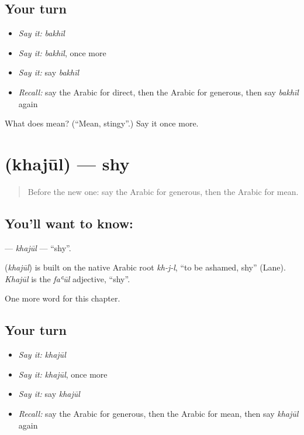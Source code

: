 \subsection*{Your turn}
\begin{itemize}
\raggedright
  \item \emph{Say it:} \emph{bakhīl}
  \item \emph{Say it:} \emph{bakhīl}, once more
  \item \emph{Say it:} say \emph{bakhīl}
  \item \emph{Recall:} say the Arabic for direct, then the Arabic for generous, then say \emph{bakhīl} again
\end{itemize}

\begin{tcolorbox}[breakable,colback=teal!4,colframe=teal!35!black,title={Before you move on}]
What does  mean? (\textquotedblleft{}Mean, stingy\textquotedblright{}.) Say it once more.
\end{tcolorbox}
\section[\texorpdfstring{\ar{خجول} (khajūl)}{خجول (khajūl)}]{ (khajūl) — shy}

\label{lesson:AR-C210-khajul}



\begin{quote}
Before the new one: say the Arabic for generous, then the Arabic for mean.
\end{quote}

\subsection*{You'll want to know: }
\textbf{} — \emph{khajūl} — \textquotedblleft{}shy\textquotedblright{}.

\begin{cousinweb}
\textbf{} (\emph{khajūl}) is built on the native Arabic root \emph{kh-j-l}, \textquotedblleft{}to be ashamed, shy\textquotedblright{} (Lane). \emph{Khajūl} is the \emph{faʿūl} adjective, \textquotedblleft{}shy\textquotedblright{}.
\end{cousinweb}

\begin{grammarlens}[title={What you've built}]
One more word for this chapter.
\end{grammarlens}

\subsection*{Your turn}
\begin{itemize}
\raggedright
  \item \emph{Say it:} \emph{khajūl}
  \item \emph{Say it:} \emph{khajūl}, once more
  \item \emph{Say it:} say \emph{khajūl}
  \item \emph{Recall:} say the Arabic for generous, then the Arabic for mean, then say \emph{khajūl} again
\end{itemize}

